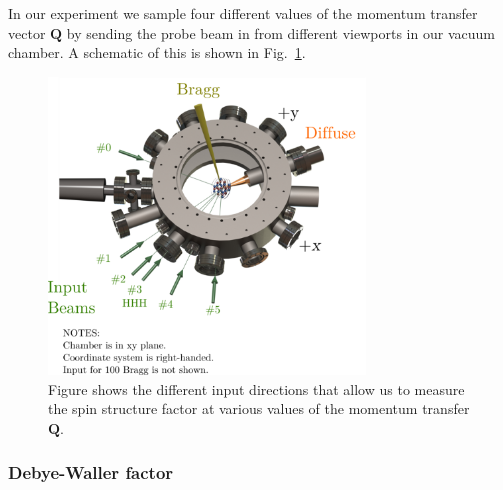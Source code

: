 \documentclass[11pt,letter]{article}
\newcommand{\bv}[1]{\ensuremath{\bm{#1}}}
\begin{document}
In our experiment we sample four different values of the momentum
transfer vector $\bv{Q}$ by sending the probe beam in from different
viewports in our vacuum chamber.   A schematic of this is shown in Fig.~\ref{fig:bragg_scattering_setup}. 
\begin{figure}
\centering \includegraphics[width=0.75\textwidth]{figures/bragg_setup_illustration_320px.png}
\caption[Bragg scattering setup]{\small Figure shows the different input directions that allow us to measure the spin structure factor at various values of the momentum transfer $\bv{Q}$.  }
\label{fig:bragg_scattering_setup}
\end{figure}

\subsubsection{Debye-Waller factor} 
\end{document}
